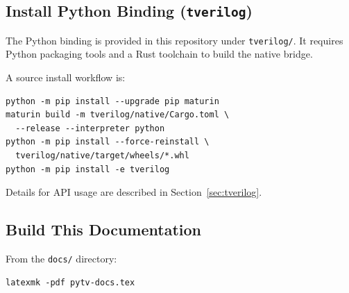 \subsection{Install Python Binding (\texttt{tverilog})}
The Python binding is provided in this repository under \texttt{tverilog/}.
It requires Python packaging tools and a Rust toolchain to build the native bridge.

A source install workflow is:
\begin{verbatim}
python -m pip install --upgrade pip maturin
maturin build -m tverilog/native/Cargo.toml \
  --release --interpreter python
python -m pip install --force-reinstall \
  tverilog/native/target/wheels/*.whl
python -m pip install -e tverilog
\end{verbatim}

Details for API usage are described in Section~\ref{sec:tverilog}.

\subsection{Build This Documentation}
From the \texttt{docs/} directory:
\begin{verbatim}
latexmk -pdf pytv-docs.tex
\end{verbatim}

